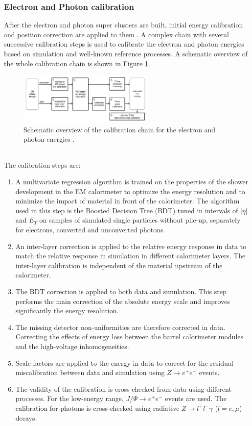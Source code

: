 \subsubsection{Electron and Photon calibration}
\label{chap2:Objects:Egamma:Cal}
After the electron and photon super clusters are built, initial energy calibration and position correction are applied to them \cite{Egamma_Calibration}. A complex chain with several successive calibration steps is used to calibrate the electron and photon energies based on simulation and well-known reference processes. A schematic overview of the whole calibration chain is shown in Figure \ref{fig:chap2:Objects:Egamma:Cal}.
\begin{figure}[htbp]
    \centering
    \includegraphics[width=0.6\textwidth]{Ch2/Img/Calibration_Chain.png}
    \caption{Schematic overview of the calibration chain for the electron and photon energies \cite{Egamma_Calib_run1}.}
    \label{fig:chap2:Objects:Egamma:Cal}
\end{figure}
\\
The calibration steps are:
\begin{enumerate}
    \item A multivariate regression algorithm is trained on the properties of the shower development in the EM calorimeter to optimize the energy resolution and to minimize the impact of material in front of the calorimeter. The algorithm used in this step is the Boosted Decision Tree (BDT) tuned in intervals of $|\eta|$ and $E_T$ on samples of simulated single particles without pile-up, separately for electrons, converted and unconverted photons. 
    \item An inter-layer correction is applied to the relative energy response in data to match the relative response in simulation in different calorimeter layers. The inter-layer calibration is independent of the material upstream of the calorimeter.
    \item The BDT correction is applied to both data and simulation. This step performs the main correction of the absolute energy scale and improves significantly the energy resolution.
    \item The missing detector non-uniformities are therefore corrected in data. Correcting the effects of energy loss between the barrel calorimeter modules and the high-voltage inhomogeneities.
    \item Scale factors are applied to the energy in data to correct for the residual miscalibration between data and simulation using $Z\rightarrow e^+e^-$ events.
    \item The validity of the calibration is cross-checked from data using different processes. For the low-energy range, $J/\Psi\rightarrow e^+e^-$ events are used. The calibration for photons is cross-checked using radiative $Z\rightarrow l^+l^-\gamma$ ($l=e,\mu$) decays.
\end{enumerate}

